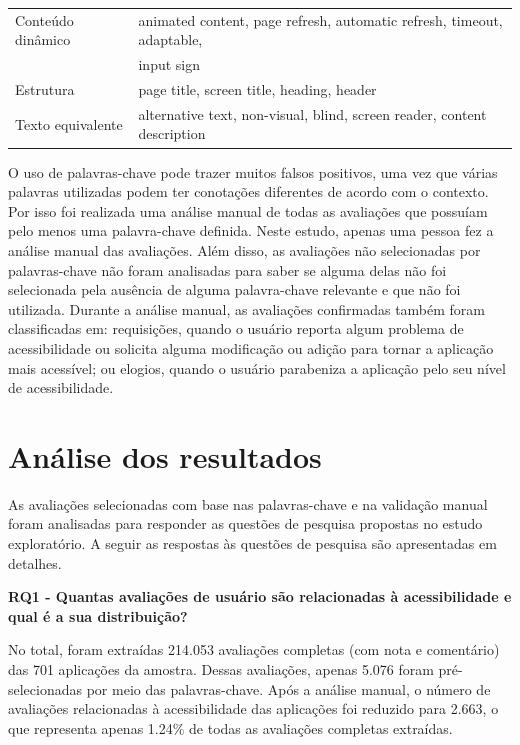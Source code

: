 \begin{table}[!htb]
\begin{tabular}{|l|l|}
\hline
Conteúdo dinâmico & animated content, page refresh, automatic  
refresh, timeout,  adaptable, \\&input sign                                                               \\

\hline
Estrutura                   & page title, screen title, heading, header                                                                                                         \\
\hline
Texto equivalente             & alternative text, non-visual, blind, screen reader, content description  \\
\hline
\end{tabular}
\end{table}

O uso de palavras-chave pode trazer muitos falsos positivos, uma vez que várias palavras utilizadas podem ter conotações diferentes de acordo com o contexto. Por isso foi realizada uma análise manual de todas as avaliações que possuíam pelo menos uma palavra-chave definida. Neste estudo, apenas uma pessoa fez a análise manual das avaliações. Além disso, as avaliações não selecionadas por palavras-chave não foram analisadas para saber se alguma delas não foi selecionada pela ausência de alguma palavra-chave relevante e que não foi utilizada. Durante a análise manual, as avaliações confirmadas também foram classificadas em: 
requisições, quando o usuário reporta algum problema de acessibilidade ou solicita alguma modificação ou adição para tornar a aplicação mais acessível;
ou elogios, quando o usuário parabeniza a aplicação pelo seu nível de acessibilidade.


\section{Análise dos resultados}

As avaliações selecionadas com base nas palavras-chave e na validação manual foram analisadas para responder as questões de pesquisa propostas no estudo exploratório. A seguir as respostas às questões de pesquisa são apresentadas em detalhes. 

 
\textbf{RQ1 - Quantas avaliações de usuário são relacionadas à acessibilidade e qual é a sua distribuição? }

No total, foram extraídas 214.053 avaliações completas (com nota e comentário) das 701 aplicações da amostra. 
Dessas avaliações, apenas 5.076 foram pré-selecionadas por meio das palavras-chave. 
Após a análise manual, o número de avaliações relacionadas à acessibilidade das aplicações foi reduzido para 2.663, o que representa apenas 1.24\% de todas as avaliações completas extraídas.

